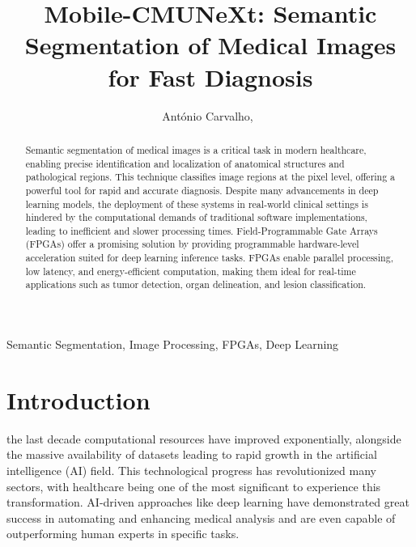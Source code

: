 \documentclass[lettersize,journal]{IEEEtran}
\newcommand{\modelname}{Mobile-CMUNeXt}
\begin{document}
\title{{\modelname}: Semantic Segmentation of Medical Images for Fast Diagnosis}

\author{António Carvalho,~}


\maketitle

\begin{abstract}

Semantic segmentation of medical images is a critical task in modern healthcare, enabling precise identification and localization of anatomical structures and pathological regions. This technique classifies image regions at the pixel level, offering a powerful tool for rapid and accurate diagnosis. Despite many advancements in deep learning models, the deployment of these systems in real-world clinical settings is hindered by the computational demands of traditional software implementations, leading to inefficient and slower processing times. Field-Programmable Gate Arrays (FPGAs) offer a promising solution by providing programmable hardware-level acceleration suited for deep learning inference tasks. FPGAs enable parallel processing, low latency, and energy-efficient computation, making them ideal for real-time applications such as tumor detection, organ delineation, and lesion classification.
\end{abstract}

\begin{IEEEkeywords}
Semantic Segmentation, Image Processing, FPGAs, Deep Learning
\end{IEEEkeywords}

\section{Introduction}
 the last decade computational resources have improved exponentially, alongside the massive availability of datasets leading to rapid growth in the artificial intelligence (AI) field. This technological progress has revolutionized many sectors, with healthcare being one of the most significant to experience this transformation. AI-driven approaches like deep learning have demonstrated great success in automating and enhancing medical analysis and are even capable of outperforming human experts in specific tasks. 
\end{document}
